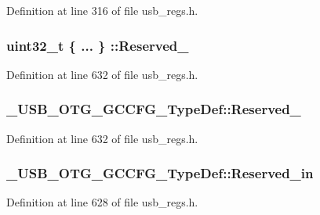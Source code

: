 Definition at line 316 of file usb\-\_\-regs.\-h.

\hypertarget{group___u_s_b___o_t_g___d_r_i_v_e_r_ga59067866ec92a9592cce6c44bfafc040}{
\subsubsection[{Reserved\-\_\-17}]{\setlength{\rightskip}{0pt plus 5cm}uint32\-\_\-t \{ ... \} \-::Reserved\-\_}}\label{group___u_s_b___o_t_g___d_r_i_v_e_r_ga59067866ec92a9592cce6c44bfafc040}


Definition at line 632 of file usb\-\_\-regs.\-h.

\hypertarget{group___u_s_b___o_t_g___d_r_i_v_e_r_gae0cd177212dfd31bf75e1eee2f58ded7}{
\subsubsection[{Reserved\-\_\-17}]{ \-\_\-\-U\-S\-B\-\_\-\-O\-T\-G\-\_\-\-G\-C\-C\-F\-G\-\_\-\-Type\-Def\-::\-Reserved\-\_}}\label{group___u_s_b___o_t_g___d_r_i_v_e_r_gae0cd177212dfd31bf75e1eee2f58ded7}


Definition at line 632 of file usb\-\_\-regs.\-h.

\hypertarget{group___u_s_b___o_t_g___d_r_i_v_e_r_ga8242aeaf1ab3d3578762591e4df7f75f}{
\subsubsection[{Reserved\-\_\-in}]{ \-\_\-\-U\-S\-B\-\_\-\-O\-T\-G\-\_\-\-G\-C\-C\-F\-G\-\_\-\-Type\-Def\-::\-Reserved\-\_\-in}}\label{group___u_s_b___o_t_g___d_r_i_v_e_r_ga8242aeaf1ab3d3578762591e4df7f75f}


Definition at line 628 of file usb\-\_\-regs.\-h.

